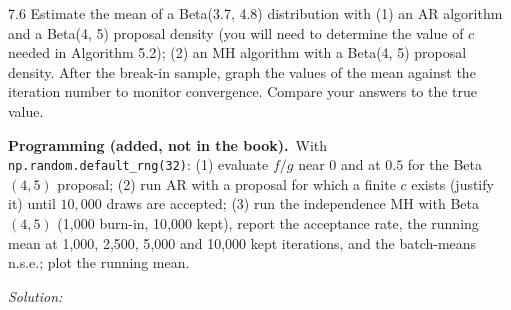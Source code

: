 \documentclass[11pt,a4paper]{article}
\newif\ifsolucoes
\newcommand{\espacoresol}{4.5cm}   %
\numberwithin{equation}{questao}   %
\newcommand{\programacao}{\par\smallskip\noindent\textbf{Programming (added, not in the book).}~}
\newcommand{\resolespaco}{\ifsolucoes\else\par\textit{Solution:}\vspace{\espacoresol}\par\fi}
\newcommand{\1}{\mathbf{1}}
\begin{document}
7.6 Estimate the mean of a Beta(3.7, 4.8) distribution with (1) an AR algorithm and a Beta(4, 5)
proposal density (you will need to determine the value of $c$ needed in Algorithm 5.2); (2) an MH
algorithm with a Beta(4, 5) proposal density. After the break-in sample, graph the values of the
mean against the iteration number to monitor convergence. Compare your answers to the true value.
\programacao With \texttt{np.random.default\_rng(32)}: (1) evaluate $f/g$ near $0$ and at $0.5$ for
the Beta$(4,5)$ proposal; (2) run AR with a proposal for which a finite $c$ exists (justify it) until
$10{,}000$ draws are accepted; (3) run the independence MH with Beta$(4,5)$ (1{,}000 burn-in,
10{,}000 kept), report the acceptance rate, the running mean at 1{,}000, 2{,}500, 5{,}000 and 10{,}000
kept iterations, and the batch-means n.s.e.; plot the running mean.
\resolespaco
\end{document}
